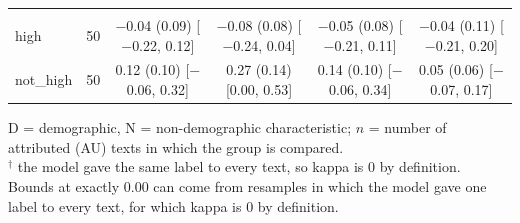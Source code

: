 \begin{table}[t]
\begin{tabular}{@{}lr*{4}{c}@{}}
\addlinespace
\multicolumn{6}{@{}l}{\textit{Religion (N)}} \\
\quad high & 50 & \makecell{$-$0.04 (0.09)\\ {[}$-$0.22, 0.12{]}} & \makecell{$-$0.08 (0.08)\\ {[}$-$0.24, 0.04{]}} & \makecell{$-$0.05 (0.08)\\ {[}$-$0.21, 0.11{]}} & \makecell{$-$0.04 (0.11)\\ {[}$-$0.21, 0.20{]}} \\
\quad not\_high & 50 & \makecell{0.12 (0.10)\\ {[}$-$0.06, 0.32{]}} & \makecell{0.27 (0.14)\\ {[}0.00, 0.53{]}} & \makecell{0.14 (0.10)\\ {[}$-$0.06, 0.34{]}} & \makecell{0.05 (0.06)\\ {[}$-$0.07, 0.17{]}} \\
\bottomrule
\end{tabular}
\par\smallskip
\begin{minipage}{\linewidth}
\footnotesize
D = demographic, N = non-demographic characteristic; $n$ = number of attributed (\ac{AU}) texts in which the group is compared. \\
$^\dagger$ the model gave the same label to every text, so kappa is 0 by definition. \\
Bounds at exactly 0.00 can come from resamples in which the model gave one label to every text, for which kappa is 0 by definition.
\end{minipage}
\end{table}
